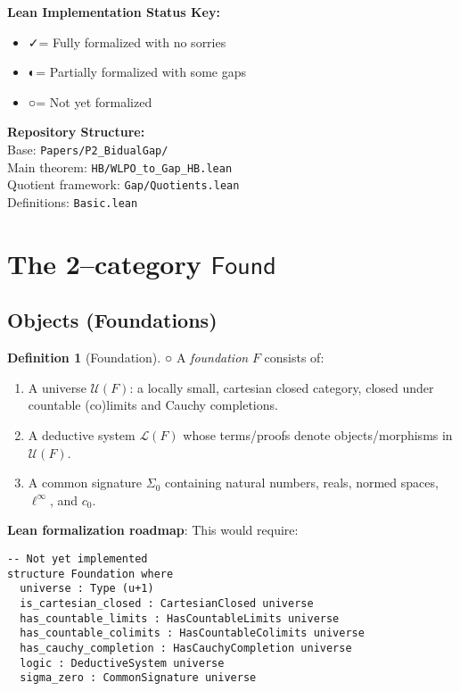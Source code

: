 \documentclass[11pt]{article}
\theoremstyle{definition}
\newtheorem{definition}[theorem]{Definition}
\theoremstyle{remark}
\newcommand{\leanok}{\textcolor{green!70!black}{✓}}
\newcommand{\leanpartial}{\textcolor{orange!70!black}{◐}}
\newcommand{\leanpending}{\textcolor{red!70!black}{○}}
\newcommand{\leanloc}[1]{\texttt{\footnotesize\color{blue!60!black}#1}}
\newcommand{\cnull}{c_0}
\newcommand{\linf}{\ell^\infty}
\newcommand{\Found}{\mathsf{Found}}
\begin{document}
\begin{mdframed}[style=leanbox]
\textbf{Lean Implementation Status Key:}
\begin{itemize}
\item \leanok = Fully formalized with no sorries
\item \leanpartial = Partially formalized with some gaps
\item \leanpending = Not yet formalized
\end{itemize}

\textbf{Repository Structure:}\\
Base: \leanloc{Papers/P2\_BidualGap/}\\
Main theorem: \leanloc{HB/WLPO\_to\_Gap\_HB.lean}\\
Quotient framework: \leanloc{Gap/Quotients.lean}\\
Definitions: \leanloc{Basic.lean}
\end{mdframed}

\section{The 2--category \texorpdfstring{$\Found$}{Found}}\label{sec:Found}

\subsection{Objects (Foundations)}\label{ssec:Found-objects}

\begin{definition}[Foundation]\label{def:foundation} \leanpending
A \emph{foundation} \(F\) consists of:
\begin{enumerate}
\item A universe \(\mathcal U(F)\): a locally small, cartesian closed category, closed under countable (co)limits and Cauchy completions.
\item A deductive system \(\mathcal L(F)\) whose terms/proofs denote objects/morphisms in \(\mathcal U(F)\).
\item A common signature \(\Sigma_0\) containing natural numbers, reals, normed spaces, \(\linf\), and \(\cnull\).
\end{enumerate}
\end{definition}

\begin{mdframed}[style=roadmap]
\textbf{Lean formalization roadmap}: This would require:
\begin{verbatim}
-- Not yet implemented
structure Foundation where
  universe : Type (u+1)
  is_cartesian_closed : CartesianClosed universe
  has_countable_limits : HasCountableLimits universe
  has_countable_colimits : HasCountableColimits universe
  has_cauchy_completion : HasCauchyCompletion universe
  logic : DeductiveSystem universe
  sigma_zero : CommonSignature universe
\end{verbatim}
\end{mdframed}
\end{document}
